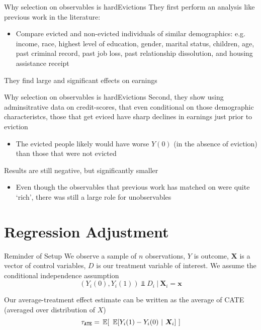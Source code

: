 \documentclass[aspectratio=169,t,11pt,table]{beamer}
\begin{document}
\begin{frame}{Why selection on observables is hard}{Evictions}
  They first perform an analysis like previous work in the literature:
  \begin{itemize}
    \item Compare evicted and non-evicted individuals of similar demographics: e.g. income, race, highest level of education, gender, marital status,
    children, age, past criminal record, past job loss, past relationship dissolution, and housing assistance receipt
  \end{itemize}
  
  \bigskip
  They find large and significant effects on earnings
\end{frame}

\begin{frame}{Why selection on observables is hard}{Evictions}
  Second, they show using adminsitrative data on credit-scores, that even conditional on those demographic characteristcs, those that get eviced have sharp declines in earnings just prior to eviction
  \begin{itemize}
    \item The evicted people likely would have worse $Y(0)$ (in the absence of eviction) than those that were not evicted
  \end{itemize}

  \pause
  \bigskip
  Results are still negative, but significantly smaller
  \begin{itemize}
    \item Even though the observables that previous work has matched on were quite `rich', there was still a large role for unobservables
  \end{itemize}
\end{frame}



\section{Regression Adjustment}

\begin{frame}{Reminder of Setup}
  We observe a sample of $n$ observations, $Y$ is outcome, $\bm{X}$ is a vector of control variables, $D$ is our treatment variable of interest. We assume the conditional independence assumption
  $$
    (Y_{i}(0), Y_{i}(1)) \Perp D_i \ \vert \ \bm{X}_i = \bm{x}
  $$

  \pause
  \bigskip
  Our average-treatment effect estimate can be written as the average of CATE (averaged over distribution of $X$)
  $$
    \tau_{\texttt{ATE}} = \expec{\ \expec{Y_i(1) - Y_i(0)}{\bm{X}_i}\ }
  $$
\end{frame}
\end{document}
